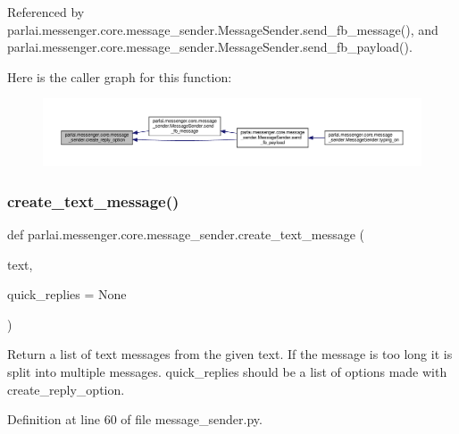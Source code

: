 Referenced by parlai.\+messenger.\+core.\+message\+\_\+sender.\+Message\+Sender.\+send\+\_\+fb\+\_\+message(), and parlai.\+messenger.\+core.\+message\+\_\+sender.\+Message\+Sender.\+send\+\_\+fb\+\_\+payload().

Here is the caller graph for this function\+:
\nopagebreak
\begin{figure}[H]
\begin{center}
\leavevmode
\includegraphics[width=350pt]{namespaceparlai_1_1messenger_1_1core_1_1message__sender_ad1b8681b56d567251598624cf3efa587_icgraph}
\end{center}
\end{figure}
\mbox{\label{namespaceparlai_1_1messenger_1_1core_1_1message__sender_a5476d988fc16eb2cf726dc63e72fb0f5}} 
\subsubsection{\texorpdfstring{create\+\_\+text\+\_\+message()}{create\_text\_message()}}
{\footnotesize\ttfamily def parlai.\+messenger.\+core.\+message\+\_\+sender.\+create\+\_\+text\+\_\+message (\begin{DoxyParamCaption}\item[{}]{text,  }\item[{}]{quick\+\_\+replies = {\ttfamily None} }\end{DoxyParamCaption})}

\begin{DoxyVerb}Return a list of text messages from the given text. If the message is
too long it is split into multiple messages.
quick_replies should be a list of options made with create_reply_option.
\end{DoxyVerb}
 

Definition at line 60 of file message\+\_\+sender.\+py.




